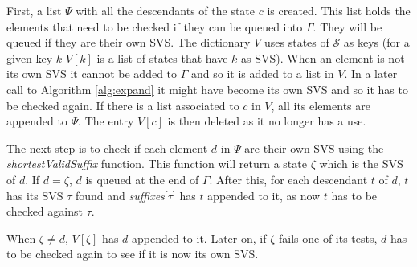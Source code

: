 {First, a list $\Psi$ with all the descendants of the state $c$ is created. This list holds the elements that need to be checked if they can be queued into $\Gamma$. They will be queued if they are their own SVS.  The dictionary $V$ uses states of $\mathcal{S}$ as keys (for a given key $k$ $V[k]$ is a list of states that have $k$ as SVS). When an element is not its own SVS it cannot be added to $\Gamma$ and so it is added to a list in $V$. In a later call to Algorithm \ref{alg:expand} it might have become its own SVS and so it has to be checked again. If there is a list associated to $c$ in $V$, all its elements are appended to $\Psi$. The entry $V[c]$ is then deleted as it no longer has a use.

The next step is to check if each element $d$ in $\Psi$ are their own SVS using the \textit{shortestValidSuffix} function. This function will return a state $\zeta$ which is the SVS of $d$. If $d = \zeta$, $d$ is queued at the end of $\Gamma$. After this, for each descendant $t$ of $d$, $t$ has its SVS $\tau$ found and \textit{suffixes}[$\tau$] has $t$ appended to it, as now $t$ has to be checked against $\tau$.

When $\zeta \neq d$, $V[\zeta]$ has $d$ appended to it. Later on, if $\zeta$ fails one of its tests, $d$ has to be checked again to see if it is now its own SVS.

%
  
}

